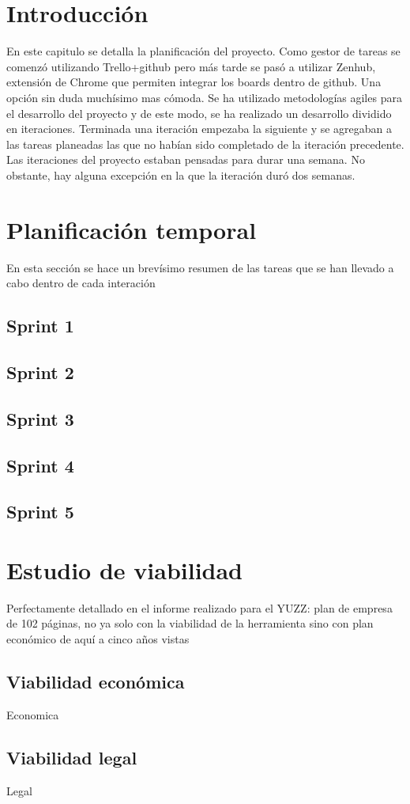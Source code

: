 
\section{Introducción}\label{introduccion-plan}
En este capitulo se detalla la planificación del proyecto. Como gestor de tareas se comenzó utilizando Trello+github pero más tarde se pasó a utilizar Zenhub, extensión de Chrome que permiten integrar los boards dentro de github. Una opción sin duda muchísimo mas cómoda. 
Se ha utilizado metodologías agiles para el desarrollo del proyecto y de este modo, se ha realizado un desarrollo dividido en iteraciones. Terminada una iteración empezaba la siguiente y se agregaban a las tareas planeadas las que no habían sido completado de la iteración precedente. Las iteraciones del proyecto estaban pensadas para durar una semana. No obstante, hay alguna excepción en la que la iteración duró dos semanas. 


\section{Planificación temporal}\label{planificacion-temporal}
En esta sección se hace un brevísimo resumen de las tareas que se han llevado a cabo dentro de cada interación
\subsection{Sprint 1}
\subsection{Sprint 2}
\subsection{Sprint 3}
\subsection{Sprint 4}
\subsection{Sprint 5}


\section{Estudio de viabilidad}\label{estudio-viabilidad}
Perfectamente detallado en el informe realizado para el YUZZ: plan de empresa de 102 páginas, no ya solo con la viabilidad de la herramienta sino con plan económico de aquí a cinco años vistas 


\subsection{Viabilidad económica}\label{viabilidad-economica}
Economica

\subsection{Viabilidad legal}\label{viabilidad-legal}
Legal


